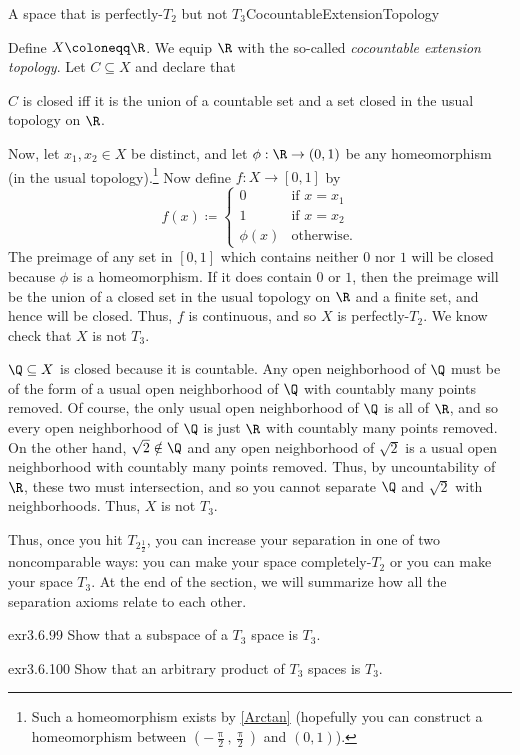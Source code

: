 \begin{exm}{A space that is perfectly-$T_2$ but not $T_3$}{CocountableExtensionTopology}
\forwardref

\noindent
Define $X\coloneqq \R$.  We equip $\R$ with the so-called \emph{cocountable extension topology}.  Let $C\subseteq X$ and declare that
\begin{textequation}
$C$ is closed iff it is the union of a countable set and a set closed in the usual topology on $\R$.
\end{textequation}

Now, let $x_1,x_2\in X$ be distinct, and let $\phi :\R \rightarrow (0,1)$ be any homeomorphism (in the usual topology).\footnote{Such a homeomorphism exists by \cref{Arctan} (hopefully you can construct a homeomorphism between $(-\frac{\uppi}{2},\frac{\uppi}{2})$ and $(0,1)$).}  Now define $f\colon X\rightarrow [0,1]$ by
\begin{equation}
f(x)\coloneqq \begin{cases}0 & \text{if }x=x_1 \\ 1 & \text{if }x=x_2 \\ \phi (x) & \text{otherwise.}\end{cases}
\end{equation}
The preimage of any set in $[0,1]$ which contains neither $0$ nor $1$ will be closed because $\phi$ is a homeomorphism.  If it does contain $0$ or $1$, then the preimage will be the union of a closed set in the usual topology on $\R$ and a finite set, and hence will be closed.  Thus, $f$ is continuous, and so $X$ is perfectly-$T_2$.  We know check that $X$ is not $T_3$.

$\Q \subseteq X$ is closed because it is countable.  Any open neighborhood of $\Q$ must be of the form of a usual open neighborhood of $\Q$ with countably many points removed.  Of course, the only usual open neighborhood of $\Q$ is all of $\R$, and so every open neighborhood of $\Q$ is just $\R$ with countably many points removed.  On the other hand, $\sqrt{2}\notin \Q$ and any open neighborhood of $\sqrt{2}$ is a usual open neighborhood with countably many points removed.  Thus, by uncountability of $\R$, these two must intersection, and so you cannot separate $\Q$ and $\sqrt{2}$ with neighborhoods.  Thus, $X$ is not $T_3$.
\end{exm}
Thus, once you hit $T_{2\frac{1}{2}}$, you can increase your separation in one of two noncomparable ways:  you can make your space completely-$T_2$ or you can make your space $T_3$.  At the end of the section, we will summarize how all the separation axioms relate to each other.
\begin{exr}{}{exr3.6.99}
Show that a subspace of a $T_3$ space is $T_3$.
\end{exr}
\begin{exr}{}{exr3.6.100}
Show that an arbitrary product of $T_3$ spaces is $T_3$.
\end{exr}

